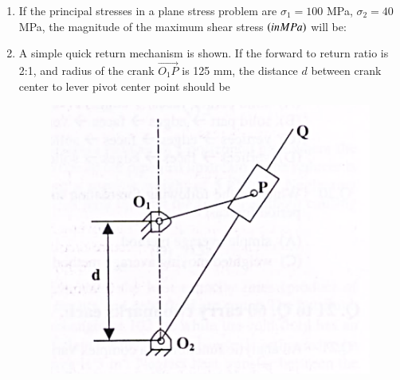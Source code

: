 \documentclass[journal]{IEEEtran}
\begin{document}
\begin{enumerate}[leftmargin=0pt]
  \begin{enumerate}
  \end{enumerate}
  \hfill{}

\item If the principal stresses in a plane stress problem are $\sigma_1 = 100$ MPa, $\sigma_2 = 40$ MPa, the magnitude of the maximum shear stress $\left(in MPa\right)$ will be:
  \begin{enumerate}
  \end{enumerate}
  \hfill{}

\item A simple quick return mechanism is shown. If the forward to return ratio is 2:1, and radius of the crank $\vec{O_1P}$ is 125 mm, the distance $d$  between crank center to lever pivot center point should be
    \begin{figure}[h]
      \centering
      \includegraphics[width=0.3\linewidth]{Figs/image (3).png}
      \caption{}
      \label{fig:12}
    \end{figure}
    
  \begin{enumerate}
  \end{enumerate}
  \hfill{}



\end{enumerate}
\end{document}
